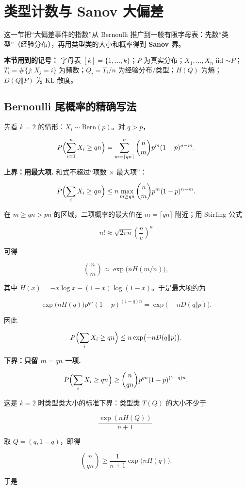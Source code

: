 \section{类型计数与 Sanov 大偏差}


这一节把“大偏差事件的指数”从 Bernoulli 推广到一般有限字母表：先数“类型”（经验分布），再用类型类的大小和概率得到 \textbf{Sanov 界}。

\textbf{本节用到的记号：} 字母表 $[k]=\{1,\dots,k\}$；$P$ 为真实分布；$X_1,\dots,X_n$ iid $\sim P$；$T_i=\#\{j:X_j=i\}$ 为频数；$Q_i=T_i/n$ 为经验分布/类型；$H(Q)$ 为熵；$D(Q\Vert P)$ 为 KL 散度。

\subsection{Bernoulli 尾概率的精确写法}


先看 $k=2$ 的情形：$X_i\sim\mathrm{Bern}(p)$。对 $q>p$，

\[
P\Bigl(\sum_{i=1}^nX_i\ge qn\Bigr)
=\sum_{m=\lceil qn\rceil}^{n}\binom nm p^m(1-p)^{n-m}.
\]

\textbf{上界：用最大项.} 和式不超过“项数 × 最大项”：

\[
P\Bigl(\sum_iX_i\ge qn\Bigr)
\le n\max_{m\ge qn}\binom nm p^m(1-p)^{n-m}.
\]

在 $m\ge qn>pn$ 的区域，二项概率的最大值在 $m=\lceil qn\rceil$ 附近；用 Stirling 公式

\[
n!\approx\sqrt{2\pi n}\left(\frac ne\right)^n
\]

可得

\[
\binom nm\approx\exp\bigl(nH(m/n)\bigr),
\]

其中 $H(x)=-x\log x-(1-x)\log(1-x)$。于是最大项约为

\[
\exp\bigl(nH(q)\bigr)p^{qn}(1-p)^{(1-q)n}
=\exp\bigl(-nD(q\Vert p)\bigr).
\]

因此

\[
P\Bigl(\sum_iX_i\ge qn\Bigr)
\le n\exp\bigl(-nD(q\Vert p)\bigr).
\]

\textbf{下界：只留 $m=qn$ 一项.}

\[
P\Bigl(\sum_iX_i\ge qn\Bigr)
\ge\binom{n}{qn}p^{qn}(1-p)^{(1-q)n}.
\]

这是 $k=2$ 时类型类大小的标准下界：类型类 $T(Q)$ 的大小不少于

\[
\frac{\exp(nH(Q))}{n+1}.
\]

取 $Q=(q,1-q)$，即得

\[
\binom{n}{qn}\ge\frac1{n+1}\exp\bigl(nH(q)\bigr).
\]

于是

